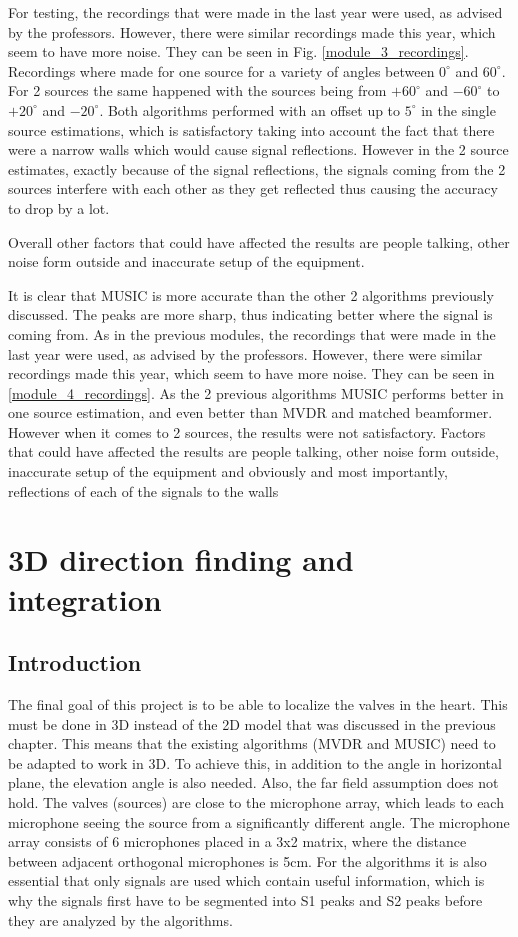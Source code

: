 For testing, the recordings that were made in the last year were used, as advised by the professors. However, there were similar recordings made this year, which seem to have more noise. They can be seen in Fig. \ref{module_3_recordings}. Recordings where made for one source for a variety of angles between $0^\circ$ and $60^\circ$. For 2 sources the same happened with the sources being from $+60^\circ$ and $-60^\circ$ to $+20^\circ$ and $-20^\circ$.
Both algorithms performed with an offset up to $5^\circ$ in the single source estimations, which is satisfactory taking into account the fact that there were a narrow walls which would cause signal reflections.
However in the 2 source estimates, exactly because of the signal reflections, the signals coming from the 2 sources interfere with each other as they get reflected thus causing the accuracy to drop by a lot.

Overall other factors that could have affected the results are people talking, other noise form outside and inaccurate setup of the equipment.

It is clear that MUSIC is more accurate than the other 2 algorithms previously discussed. The peaks are more sharp, thus indicating better where the signal is coming from. As in the previous modules, the recordings that were made in the last year were used, as advised by the professors. However, there were similar recordings made this year, which seem to have more noise. They can be seen in \ref{module_4_recordings}. As the 2 previous algorithms MUSIC performs better in one source estimation, and even better than MVDR and matched beamformer. However when it comes to 2 sources, the results were not satisfactory. Factors that could have affected the results are people talking, other noise form outside, inaccurate setup of the equipment and obviously and most importantly, reflections of each of the signals to the walls

\chapter{3D direction finding and integration}
\section{Introduction}
The final goal of this project is to be able to localize the valves in the heart. This must be done in 3D instead of the 2D model that was discussed in the previous chapter. This means that the existing algorithms (MVDR and MUSIC) need to be adapted to work in 3D.
To achieve this, in addition to the angle in horizontal plane, the elevation angle is also needed. Also, the far field assumption does not hold. The valves (sources) are close to the microphone array, which leads to each microphone seeing the source from a significantly different angle.
The microphone array consists of 6 microphones placed in a 3x2 matrix, where the distance between adjacent orthogonal microphones is 5cm.
For the algorithms it is also essential that only signals are used which contain useful information, which is why the signals first have to be segmented into S1 peaks and S2 peaks before they are analyzed by the algorithms.

